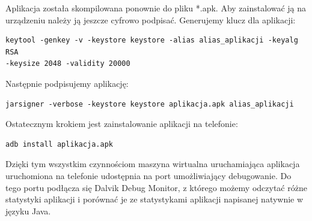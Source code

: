 Aplikacja została skompilowana ponownie do pliku *.apk. Aby zainstalować ją na urządzeniu należy ją jeszcze cyfrowo podpisać. Generujemy klucz dla aplikacji:

\begin{lstlisting}
keytool -genkey -v -keystore keystore -alias alias_aplikacji -keyalg RSA 
-keysize 2048 -validity 20000
\end{lstlisting}

Następnie podpisujemy aplikację:

\begin{lstlisting}
jarsigner -verbose -keystore keystore aplikacja.apk alias_aplikacji
\end{lstlisting}

Ostatecznym krokiem jest zainstalowanie aplikacji na telefonie:

\begin{lstlisting}
adb install aplikacja.apk
\end{lstlisting}

Dzięki tym wszystkim czynnościom maszyna wirtualna uruchamiająca aplikacja uruchomiona na telefonie udostępnia na port umożliwiający debugowanie. Do tego portu podłącza się Dalvik Debug Monitor, z którego możemy odczytać różne statystyki aplikacji i porównać je ze statystykami aplikacji napisanej natywnie w języku Java.
